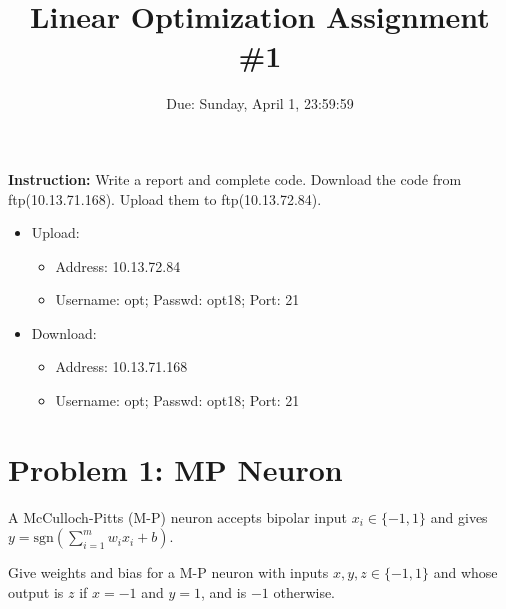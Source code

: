 \documentclass[12pt]{article}
\title{\textbf{Linear Optimization Assignment \#1}}
\author{Due: Sunday, April 1, 23:59:59}
\date{}
\providecommand{\tightlist}{%
	\setlength{\itemsep}{0pt}\setlength{\parskip}{0pt}}
\begin{document}
\maketitle

\textbf{\color{NavyBlue}Instruction:} Write a report and complete code.
Download the code from ftp(10.13.71.168). Upload them to ftp(10.13.72.84).
\begin{itemize}
	\tightlist
	\item Upload:
	      \begin{itemize}
		      \tightlist
		      \item    Address: 10.13.72.84
		      \item Username: opt; Passwd:  opt18; Port: 21
	      \end{itemize}
	\item Download:
	      \begin{itemize}
		      \tightlist
		      \item Address: 10.13.71.168
		      \item  Username: opt; Passwd:  opt18; Port: 21
	      \end{itemize}
\end{itemize}



\section{Problem 1: MP Neuron}

A McCulloch-Pitts (M-P) neuron accepts bipolar input $x_i \in \{-1,1\}$ and gives  $y=\mathrm{sgn} (\sum_{i=1}^{m} w_ix_i + b) $.

Give weights and bias for a M-P neuron with inputs
$x,y,z \in \{-1,1\}$ and whose output is  $z$ if $x = -1$ and $y = 1$, and is $-1$ otherwise.


\end{document}
